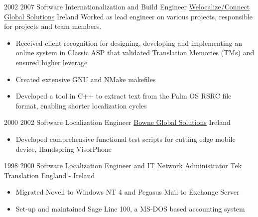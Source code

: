 \documentclass[a4paper]{twentysecondcv} %
\begin{document}
\begin{twenty}
\twentyitem
      {2002} %
  {2007} %
    {Software Internationalization and Build Engineer} %
    {\href{https://www.welocalize.com/}{Welocalize/Connect Global Solutions}} %
    {Ireland} %
    {Worked as lead engineer on various projects, responsible for projects and team members.} %
  {}
  {\begin{itemize}
    \item Received client recognition for designing, developing and implementing an online system in Classic ASP that validated Translation Memories (TMs) and ensured higher leverage
    \item Created extensive GNU and NMake makefiles
    \item Developed a tool in C++ to extract text from the Palm OS RSRC file format, enabling shorter localization cycles
   \end{itemize}
  }
\end{twenty}

\vspace{0.75\baselineskip}%

\begin{twenty}
\twentyitem
  {2000}
  {2002}
    {Software Localization Engineer}
    {\href{https://www.lionbridge.com/}{Bowne Global Solutions}}
    {Ireland}
    {}
    {}
    {\begin{itemize}
    \item Developed comprehensive functional test scripts for cutting edge mobile device, Handspring VisorPhone
   \end{itemize}
    }
\end{twenty}

\vspace{0.75\baselineskip}%

\begin{twenty}
\twentyitem
  {1998}
  {2000}
    {Software Localization Engineer and IT Network Administrator}
    {Tek Translation}
    {England - Ireland}
    {}
    {}
    {\begin{itemize}
    \item Migrated Novell to Windows NT 4 and Pegasus Mail to Exchange Server
    \item Set-up and maintained Sage Line 100, a MS-DOS based accounting system
   \end{itemize}
    }
\end{twenty}
\end{document}
